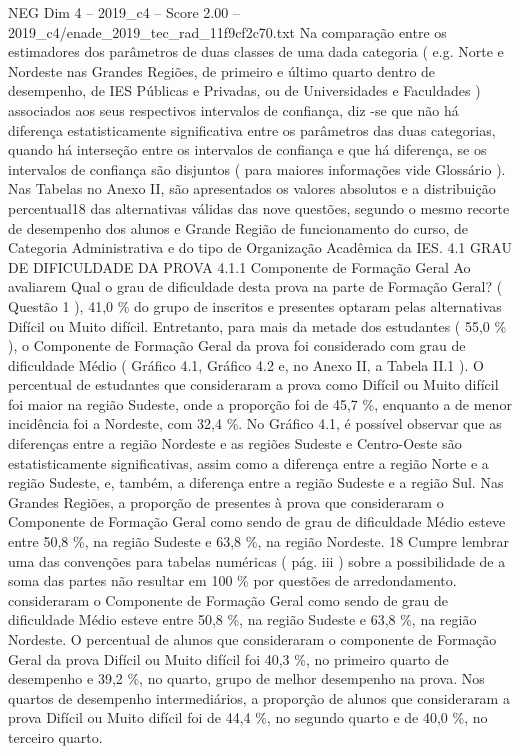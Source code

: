 \begin{textsample}{NEG Dim 4 – 2019\_c4 – Score 2.00 – 2019\_c4/enade\_2019\_tec\_rad\_11f9cf2c70.txt}
Na comparação entre os estimadores dos parâmetros de duas classes de uma dada categoria ( e.g.
Norte e Nordeste nas Grandes Regiões, de primeiro e último quarto dentro de desempenho, de IES Públicas e Privadas, ou de Universidades e Faculdades ) associados aos seus respectivos intervalos de confiança, diz -se que não há diferença estatisticamente significativa entre os parâmetros das duas categorias, quando há interseção entre os intervalos de confiança e que há diferença, se os intervalos de confiança são disjuntos ( para maiores informações vide Glossário ).
Nas Tabelas no Anexo II, são apresentados os valores absolutos e a distribuição percentual18 das alternativas válidas das nove questões, segundo o mesmo recorte de desempenho dos alunos e Grande Região de funcionamento do curso, de Categoria Administrativa e do tipo de Organização Acadêmica da IES. 4.1 GRAU DE DIFICULDADE DA PROVA 4.1.1 Componente de Formação Geral Ao avaliarem Qual o grau de dificuldade desta prova na parte de Formação Geral? ( Questão 1 ), 41,0 \% do grupo de inscritos e presentes optaram pelas alternativas Difícil ou Muito difícil.
Entretanto, para mais da metade dos estudantes ( 55,0 \% ), o Componente de Formação Geral da prova foi considerado com grau de dificuldade Médio ( Gráfico 4.1, Gráfico 4.2 e, no Anexo II, a Tabela II.1 ).
O percentual de estudantes que consideraram a prova como Difícil ou Muito difícil foi maior na região Sudeste, onde a proporção foi de 45,7 \%, enquanto a de menor incidência foi a Nordeste, com 32,4 \%.
No Gráfico 4.1, é possível observar que as diferenças entre a região Nordeste e as regiões Sudeste e Centro-Oeste são estatisticamente significativas, assim como a diferença entre a região Norte e a região Sudeste, e, também, a diferença entre a região Sudeste e a região Sul.
Nas Grandes Regiões, a proporção de presentes à prova que consideraram o Componente de Formação Geral como sendo de grau de dificuldade Médio esteve entre 50,8 \%, na região Sudeste e 63,8 \%, na região Nordeste. 18 Cumpre lembrar uma das convenções para tabelas numéricas ( pág. iii ) sobre a possibilidade de a soma das partes não resultar em 100 \% por questões de arredondamento. consideraram o Componente de Formação Geral como sendo de grau de dificuldade Médio esteve entre 50,8 \%, na região Sudeste e 63,8 \%, na região Nordeste.
O percentual de alunos que consideraram o componente de Formação Geral da prova Difícil ou Muito difícil foi 40,3 \%, no primeiro quarto de desempenho e 39,2 \%, no quarto, grupo de melhor desempenho na prova.
Nos quartos de desempenho intermediários, a proporção de alunos que consideraram a prova Difícil ou Muito difícil foi de 44,4 \%, no segundo quarto e de 40,0 \%, no terceiro quarto.

\end{textsample}
